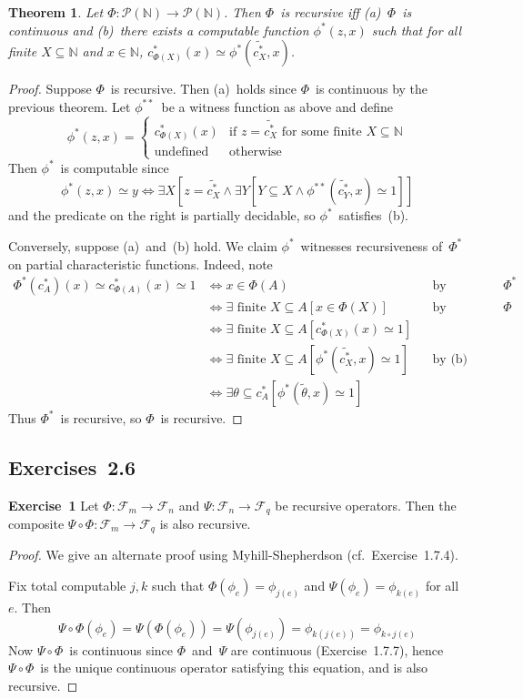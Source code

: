 \documentclass[letterpaper]{article}
\newcommand{\exercise}[2][]{\noindent\textbf{Exercise~{#2}}\ifthenelse{\isempty{#1}}{\textbf{.}}{ ({#1})\textbf{.}}}
\newcommand{\F}{\mathcal{F}}
\newcommand{\N}{\mathbb{N}}
\renewcommand{\P}{\mathcal{P}}
\newcommand{\code}[1]{\widetilde{{#1}}}
\theoremstyle{plain}
\newtheorem*{thm}{Theorem}
\theoremstyle{definition}
\theoremstyle{remark}
\begin{document}
\begin{thm}
Let $\Phi:\P(\N)\to\P(\N)$. Then $\Phi$~is recursive iff (a)~$\Phi$~is continuous and (b)~there exists a computable function $\phi^*(z,x)$ such that for all finite $X\subseteq\N$ and $x\in\N$, $c_{\Phi(X)}^*(x)\simeq\phi^*(\code{c_X^*},x)$.
\end{thm}
\begin{proof}
Suppose $\Phi$~is recursive. Then (a)~holds since $\Phi$~is continuous by the previous theorem. Let $\phi^{**}$~be a witness function as above and define
$$\phi^*(z,x)=\begin{cases}
c_{\Phi(X)}^*(x)&\text{if }z=\code{c_X^*}\text{ for some finite }X\subseteq\N\\
\text{undefined}&\text{otherwise}
\end{cases}$$
Then $\phi^*$~is computable since
$$\phi^*(z,x)\simeq y\iff\exists X[z=\code{c_X^*}\land\exists Y[Y\subseteq X\land\phi^{**}(\code{c_{Y}^*},x)\simeq 1]]$$
and the predicate on the right is partially decidable, so $\phi^*$~satisfies~(b).

Conversely, suppose (a)~and~(b) hold. We claim $\phi^*$~witnesses recursiveness of~$\Phi^*$ on partial characteristic functions. Indeed, note
\begin{align*}
\Phi^*(c_A^*)(x)\simeq c_{\Phi(A)}^*(x)\simeq 1&\iff x\in\Phi(A)&&\text{by definition of }\Phi^*\\
	&\iff \exists\text{ finite }X\subseteq A[x\in\Phi(X)]&&\text{by continuity of }\Phi\\
	&\iff \exists\text{ finite }X\subseteq A[c_{\Phi(X)}^*(x)\simeq 1]&&\\
	&\iff \exists\text{ finite }X\subseteq A[\phi^*(\code{c_X^*},x)\simeq 1]&&\text{by (b)}\\
	&\iff \exists \theta\subseteq c_A^*[\phi^*(\code{\theta},x)\simeq 1]
\end{align*}
Thus $\Phi^*$~is recursive, so $\Phi$~is recursive.
\end{proof}

\subsection*{Exercises~2.6}
\exercise{1}
Let $\Phi:\F_m\to\F_n$ and $\Psi:\F_n\to\F_q$ be recursive operators. Then the composite $\Psi\circ\Phi:\F_m\to\F_q$ is also recursive.
\begin{proof}
We give an alternate proof using Myhill-Shepherdson (cf.~Exercise~1.7.4).

Fix total computable $j,k$ such that $\Phi(\phi_e)=\phi_{j(e)}$ and $\Psi(\phi_e)=\phi_{k(e)}$ for all~$e$. Then
$$\Psi\circ\Phi(\phi_e)=\Psi(\Phi(\phi_e))=\Psi(\phi_{j(e)})=\phi_{k(j(e))}=\phi_{k\circ j(e)}$$
Now $\Psi\circ\Phi$~is continuous since $\Phi$~and~$\Psi$ are continuous (Exercise~1.7.7), hence $\Psi\circ\Phi$~is the unique continuous operator satisfying this equation, and is also recursive.
\end{proof}
\end{document}
